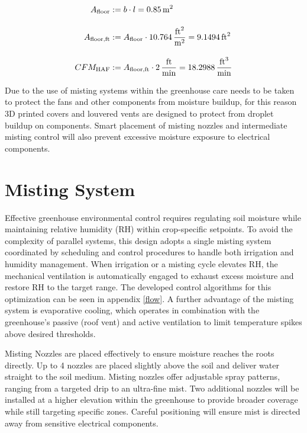 \begin{align}
	\small
	A_{\text{floor}} &:= b \cdot l = 0.85 \,\si{m^2} \\[1em]
	A_{\text{floor,ft}} &:= A_{\text{floor}} \cdot 10.764 \,\frac{\si{ft^2}}{\si{m^2}}
	= 9.1494 \,\si{ft^2} \\[1em]
	CFM_{\text{HAF}} &:= A_{\text{floor,ft}} \cdot 2 \,\frac{\si{ft}}{\si{min}}
	= 18.2988 \,\frac{\si{ft^3}}{\si{min}}
\end{align}

Due to the use of misting systems within the greenhouse care needs to be taken to protect the fans and other components from moisture buildup, for this reason 3D printed covers and louvered vents are designed to protect from droplet buildup on components. Smart placement of misting nozzles and intermediate misting control will also prevent excessive moisture exposure to electrical components.


\section{Misting System}

Effective greenhouse environmental control requires regulating soil moisture while maintaining relative humidity (RH) within crop-specific setpoints. To avoid the complexity of parallel systems, this design adopts a single misting system coordinated by scheduling and control procedures to handle both irrigation and humidity management. When irrigation or a misting cycle elevates RH, the mechanical ventilation is automatically engaged to exhaust excess moisture and restore RH to the target range. The developed control algorithms for this optimization can be seen in appendix \ref{flow}. A further advantage of the misting system is evaporative cooling, which operates in combination with the greenhouse’s passive (roof vent) and active ventilation to limit temperature spikes above desired thresholds.

Misting Nozzles are placed effectively to ensure moisture reaches the roots directly. Up to 4 nozzles are placed slightly above the soil and deliver water straight to the soil medium. Misting nozzles offer adjustable spray patterns, ranging from a targeted drip to an ultra-fine mist. Two additional nozzles will be installed at a higher elevation within the greenhouse to provide broader coverage while still targeting specific zones. Careful positioning will ensure mist is directed away from sensitive electrical components. 

